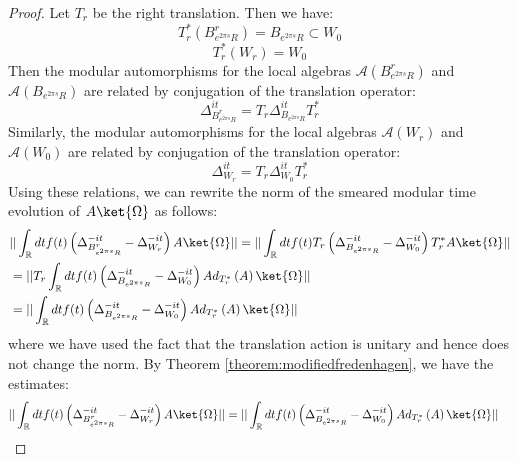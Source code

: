 \documentclass[a4paper,11pt]{article}
\theoremstyle{definition}
\theoremstyle{remark}
\newcommand{\lb}{\left(}
\newcommand{\rb}{\right)}
\begin{document}
\begin{proof}
    Let $T_r$ be the right translation. Then we have:
    \begin{equation}
        T_r^*\lb B^r_{e^{2\pi s}R}\rb = B_{e^{2\pi s}R}\subset W_0
    \end{equation}
    \begin{equation}
        T_r^*\lb W_r \rb = W_0
    \end{equation}
    Then the modular automorphisms for the local algebras $\mathcal{A}\lb B^r_{e^{2\pi s}R}\rb$ and $\mathcal{A}\lb B_{e^{2\pi s}R} \rb$ are related by conjugation of the translation operator:
    \begin{equation}
        \Delta^{it}_{B^r_{e^{2\pi s}R}} = T_r\Delta^{it}_{B_{e^{2\pi s}R}} T_r^*
    \end{equation}
    Similarly, the modular automorphisms for the local algebras $\mathcal{A}\lb W_r\rb$ and $\mathcal{A}\lb W_0\rb$ are related by conjugation of the translation operator:
    \begin{equation}
        \Delta^{it}_{W_r} = T_r\Delta^{it}_{W_0}T_r^*
    \end{equation}
    Using these relations, we can rewrite the norm of the smeared modular time evolution of $A\ket{\Omega}$ as follows:
    \begin{align}
        \begin{split}
            &||\int_\mathbb{R} dt f(t)\lb\Delta^{-it}_{B^r_{e^{2\pi s}R}} - \Delta^{-it}_{W_r}\rb A\ket{\Omega}|| = ||\int_\mathbb{R} dt f(t)T_r\lb\Delta^{-it}_{B_{e^{2\pi s}R}} - \Delta^{-it}_{W_0}\rb T^*_r A\ket{\Omega}||
            \\&
            =||T_r\int_\mathbb{R} dt f(t) \lb\Delta^{-it}_{B_{e^{2\pi s}R}}-\Delta^{-it}_{W_0}\rb Ad_{T_r^*}\lb A\rb\ket{\Omega}||
            \\&=||\int_\mathbb{R} dt f(t) \lb \Delta^{-it}_{B_{e^{2\pi s}R}} - \Delta^{-it}_{W_0}\rb Ad_{T^*_r}\lb A\rb\ket{\Omega}||
        \end{split}
    \end{align}
    where we have used the fact that the translation action is unitary and hence does not change the norm. By Theorem \ref{theorem:modifiedfredenhagen}, we have the estimates:
    \begin{align}
        \begin{split}
            &||\int_\mathbb{R} dt f(t) \lb \Delta^{-it}_{B^r_{e^{2\pi s}R}}- \Delta^{-it}_{W_r} \rb A\ket{\Omega}|| = ||\int_\mathbb{R} dt f(t) \lb \Delta^{-it}_{B_{e^{2\pi s}R}} - \Delta^{-it}_{W_0} \rb Ad_{T_r^*}\lb A\rb \ket{\Omega}||

\end{split}
\end{align}
\end{proof}
\end{document}
